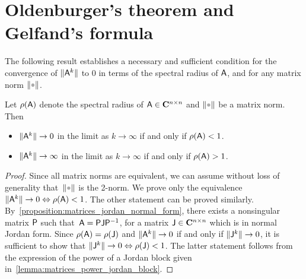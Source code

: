 \section{Oldenburger's theorem and Gelfand's formula}
The following result establishes a necessary and sufficient condition for the convergence of $\lVert\mathsf A^k\rVert$ to 0 in terms of the spectral radius of $\mathsf A$,
and for any matrix norm $\norm{\placeholder}$.
\begin{proposition}
    [Oldenburger]
    \label{proposition:matrices_convergence_power_of_matrix}
    Let $\rho(\mathsf A)$ denote the spectral radius of $\mathsf A \in \mathbf C^{n \times n}$ and $\norm{\placeholder}$ be a matrix norm.
    Then
    \begin{itemize}
        \item $\lVert\mathsf A^k\rVert \to 0$ in the limit as $k \to \infty$ if and only if $\rho(\mathsf A) < 1$.
        \item $\lVert\mathsf A^k\rVert \to \infty$ in the limit as $k \to \infty$ if and only if $\rho(\mathsf A) > 1$.
    \end{itemize}
\end{proposition}
\begin{proof}
    Since all matrix norms are equivalent,
    we can assume without loss of generality that~$\norm{\placeholder}$ is the 2-norm.
    We prove only the equivalence $\lVert\mathsf A^k\rVert \to 0 \Leftrightarrow \rho(\mathsf A) < 1$.
    The other statement can be proved similarly.
    By~\cref{proposition:matrices_jordan_normal_form},
    there exists a nonsingular matrix $\mathsf P$ such that~$\mathsf A = \mathsf P \mathsf J \mathsf P^{-1}$,
    for a matrix $\mathsf J \in \mathbf C^{n \times n}$ which is in normal Jordan form.
    Since $\rho(\mathsf A) = \rho(\mathsf J)$ and $\lVert\mathsf A^k\rVert \to 0$ if and only if $\lVert\mathsf J^k\rVert \to 0$,
    it is sufficient to show that $\lVert\mathsf J^k\rVert \to 0 \Leftrightarrow \rho(\mathsf J) < 1$.
    The latter statement follows from the expression of the power of a Jordan block given in~\cref{lemma:matrices_power_jordan_block}.
\end{proof}

